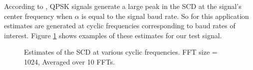 \documentclass[12pt]{article}
\begin{document}
According to \cite{Gardner2}, QPSK signals generate a large peak in the SCD at
the signal's center frequency when $\alpha$ is equal to the signal baud rate.
So for this application estimates are generated at cyclic frequencies
corresponding to baud rates of interest. Figure \ref{fig:cyclo_estimates} shows
examples of these estimates for our test signal.

\begin{figure}[bh!]
\centerline{
    \hfill
}
\centerline{
    \hfill
}
\caption{Estimates of the SCD at various cyclic frequencies. FFT size = 1024, Averaged over 10 FFTs.}
\label{fig:cyclo_estimates}
\end{figure}
\end{document}
